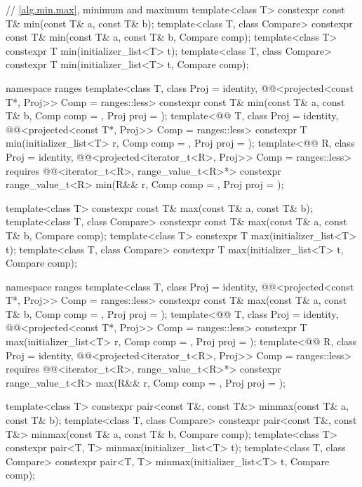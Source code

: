 \begin{codeblock}
{  // \ref{alg.min.max}, minimum and maximum
  template<class T> constexpr const T& min(const T& a, const T& b);
  template<class T, class Compare>
    constexpr const T& min(const T& a, const T& b, Compare comp);
  template<class T>
    constexpr T min(initializer_list<T> t);
  template<class T, class Compare>
    constexpr T min(initializer_list<T> t, Compare comp);

  namespace ranges {
    template<class T, class Proj = identity,
             @@<projected<const T*, Proj>> Comp = ranges::less>
      constexpr const T& min(const T& a, const T& b, Comp comp = {}, Proj proj = {});
    template<@@ T, class Proj = identity,
             @@<projected<const T*, Proj>> Comp = ranges::less>
      constexpr T min(initializer_list<T> r, Comp comp = {}, Proj proj = {});
    template<@@ R, class Proj = identity,
             @@<projected<iterator_t<R>, Proj>> Comp = ranges::less>
      requires @@<iterator_t<R>, range_value_t<R>*>
      constexpr range_value_t<R>
        min(R&& r, Comp comp = {}, Proj proj = {});
  }

  template<class T> constexpr const T& max(const T& a, const T& b);
  template<class T, class Compare>
    constexpr const T& max(const T& a, const T& b, Compare comp);
  template<class T>
    constexpr T max(initializer_list<T> t);
  template<class T, class Compare>
    constexpr T max(initializer_list<T> t, Compare comp);

  namespace ranges {
    template<class T, class Proj = identity,
             @@<projected<const T*, Proj>> Comp = ranges::less>
      constexpr const T& max(const T& a, const T& b, Comp comp = {}, Proj proj = {});
    template<@@ T, class Proj = identity,
             @@<projected<const T*, Proj>> Comp = ranges::less>
      constexpr T max(initializer_list<T> r, Comp comp = {}, Proj proj = {});
    template<@@ R, class Proj = identity,
             @@<projected<iterator_t<R>, Proj>> Comp = ranges::less>
      requires @@<iterator_t<R>, range_value_t<R>*>
      constexpr range_value_t<R>
        max(R&& r, Comp comp = {}, Proj proj = {});
  }

  template<class T> constexpr pair<const T&, const T&> minmax(const T& a, const T& b);
  template<class T, class Compare>
    constexpr pair<const T&, const T&> minmax(const T& a, const T& b, Compare comp);
  template<class T>
    constexpr pair<T, T> minmax(initializer_list<T> t);
  template<class T, class Compare>
    constexpr pair<T, T> minmax(initializer_list<T> t, Compare comp);

}
\end{codeblock}
